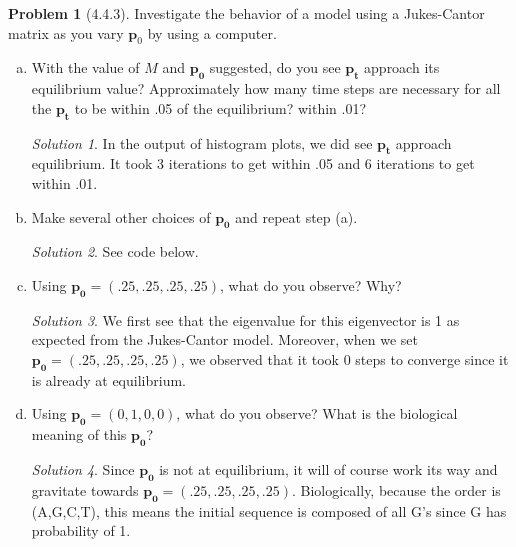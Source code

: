 \documentclass[11pt]{article}
\theoremstyle{definition}\newtheorem*{problem}{Problem}
\theoremstyle{remark}\newtheorem{claim}{Claim}
\theoremstyle{remark}\newtheorem*{sol}{Solution}
\begin{document}
\begin{problem}[4.4.3] 
Investigate the behavior of a model using a Jukes-Cantor matrix as you vary $\mathbf p_0$ by using a computer.\end{problem}
\begin{enumerate}[a.]
\item With the value of $M$ and $\mathbf {p_0}$ suggested, do you see $\mathbf {p_t}$ approach its equilibrium value? Approximately how many time steps are necessary for all the $\mathbf {p_t}$ to be within .05 of the equilibrium? within .01?
\begin{sol} In the output of histogram plots, we did see $\mathbf {p_t}$ approach equilibrium. It took 3 iterations to get within .05 and 6 iterations to get within .01.

\end{sol}

\item Make several other choices of $\mathbf {p_0}$ and repeat step (a). 
\begin{sol} See code below.

\end{sol}

\item Using $\mathbf {p_0}= (.25,.25,.25,.25)$, what do you observe? Why?
\begin{sol}
We first see that the eigenvalue for this eigenvector is 1 as expected from the Jukes-Cantor model. Moreover, when we set $\mathbf {p_0}= (.25,.25,.25,.25)$, we observed that it took 0 steps to converge since it is already at equilibrium.

\end{sol}

\item Using $\mathbf {p_0}= (0,1,0,0)$, what do you observe? What is the biological meaning of this $\mathbf {p_0}$?
\begin{sol}
Since $\mathbf {p_0}$ is not at equilibrium, it will of course work its way and gravitate towards $\mathbf {p_0}= (.25,.25,.25,.25)$. Biologically, because the order is (A,G,C,T), this means the initial sequence is composed of all G's since G has probability of 1.
\end{sol}
\end{enumerate}
\end{document}
